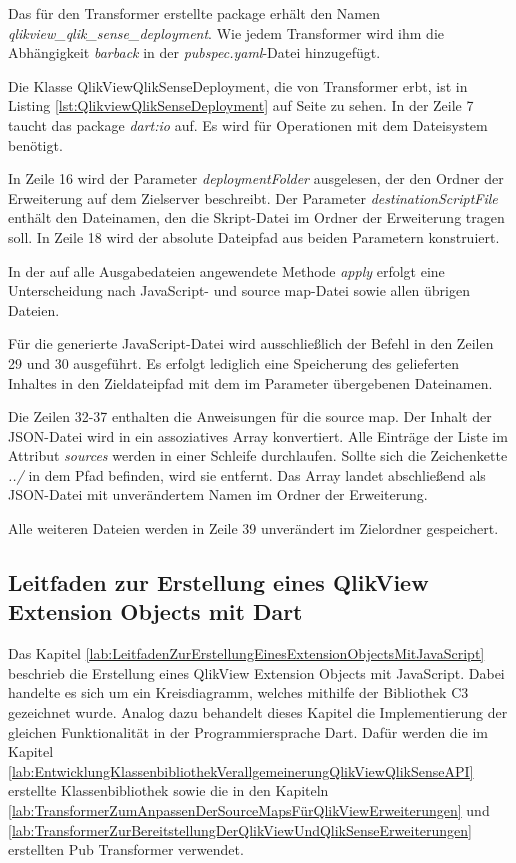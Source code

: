 Das für den Transformer erstellte package erhält den Namen \textit{qlikview\_qlik\_sense\_deployment}. Wie jedem Transformer wird ihm die Abhängig\-keit \textit{barback} in der \textit{pubspec.yaml}-Datei hinzugefügt.

Die Klasse QlikViewQlikSenseDeployment, die von Transformer erbt, ist in Listing \ref{lst:QlikviewQlikSenseDeployment} auf Seite \pageref{lst:QlikviewQlikSenseDeployment} zu sehen. In der Zeile 7 taucht das package \textit{dart:io} auf. Es wird für Operationen mit dem Dateisystem benötigt.

In Zeile 16 wird der Parameter \textit{deploymentFolder} ausgelesen, der den Ordner der Erweiterung auf dem Zielserver beschreibt. Der Parameter \textit{destinationScriptFile} enthält den Dateinamen, den die Skript-Datei im Ordner der Erweiterung tragen soll. In Zeile 18 wird der absolute Dateipfad aus beiden Parametern konstruiert.

In der auf alle Ausgabedateien angewendete Methode \textit{apply} erfolgt eine Unterscheidung nach JavaScript- und source map-Datei sowie allen übrigen Dateien.

Für die generierte JavaScript-Datei wird ausschließlich der Befehl in den Zeilen 29 und 30 ausgeführt. Es erfolgt lediglich eine Speicherung des gelieferten Inhaltes in den Zieldateipfad mit dem im Parameter übergebenen Dateinamen.

Die Zeilen 32-37 enthalten die Anweisungen für die source map. Der Inhalt der JSON-Datei wird in ein assoziatives Array konvertiert. Alle Einträge der Liste im Attribut \textit{sources} werden in einer Schleife durchlaufen. Sollte sich die Zeichenkette \textit{../} in dem Pfad befinden, wird sie entfernt. Das Array landet abschließend als JSON-Datei mit unverändertem Namen im Ordner der Erweiterung.

Alle weiteren Dateien werden in Zeile 39 unverändert im Zielordner gespeichert.





\newpage
\subsection{Leitfaden zur Erstellung eines QlikView Extension Objects mit Dart}
\label{lab:LeitfadenZurErstellungEinesQlikViewExtensionObjectsMitDart} 

Das Kapitel \ref{lab:LeitfadenZurErstellungEinesExtensionObjectsMitJavaScript} beschrieb die Erstellung eines QlikView Extension Objects mit JavaScript. Dabei handelte es sich um ein Kreisdiagramm, welches mithilfe der Bibliothek C3 gezeichnet wurde. Analog dazu behandelt dieses Kapitel die Implementierung der gleichen Funktionalität in der Programmiersprache Dart. Dafür werden die im Kapitel \ref{lab:EntwicklungKlassenbibliothekVerallgemeinerungQlikViewQlikSenseAPI} erstellte Klassen\-bibliothek sowie die in den Kapiteln \ref{lab:TransformerZumAnpassenDerSourceMapsFürQlikViewErweiterungen} und \ref{lab:TransformerZurBereitstellungDerQlikViewUndQlikSenseErweiterungen} erstellten Pub Transformer verwendet.

